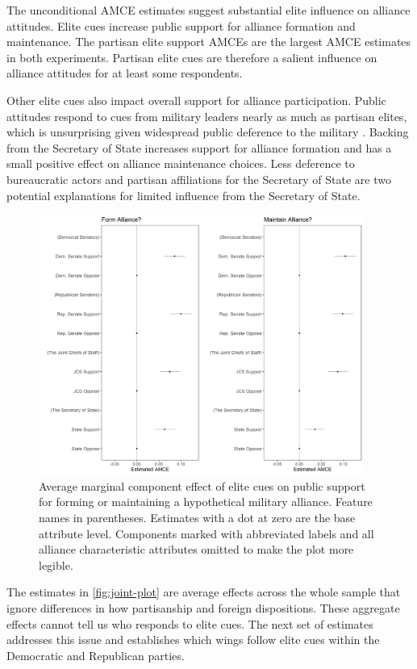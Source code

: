 \documentclass[12pt]{article}
\begin{document}
The unconditional AMCE estimates suggest substantial elite influence on alliance attitudes. 
Elite cues increase public support for alliance formation and maintenance. 
The partisan elite support AMCEs are the largest AMCE estimates in both experiments.
Partisan elite cues are therefore a salient influence on alliance attitudes for at least some respondents. 


Other elite cues also impact overall support for alliance participation. 
Public attitudes respond to cues from military leaders nearly as much as partisan elites, which is unsurprising given widespread public deference to the military \citep{Golbyetal2018}. 
Backing from the Secretary of State increases support for alliance formation and has a small positive effect on alliance maintenance choices. 
Less deference to bureaucratic actors and partisan affiliations for the Secretary of State are two potential explanations for limited influence from the Secretary of State. 


\begin{figure}[htpb]
	\centering
		\includegraphics[width=0.95\textwidth]{../figures/joint-amce-plots-el.png}
	\caption{Average marginal component effect of elite cues on public support for forming or maintaining a hypothetical military alliance. Feature names in parentheses. Estimates with a dot at zero are the base attribute level. Components marked with abbreviated labels and all alliance characteristic attributes omitted to make the plot more legible.}
	\label{fig:joint-plot}
\end{figure}


The estimates in \autoref{fig:joint-plot} are average effects across the whole sample that ignore differences in how partisanship and foreign dispositions.
These aggregate effects cannot tell us who responds to elite cues. 
The next set of estimates addresses this issue and establishes which wings follow elite cues within the Democratic and Republican parties. 
\end{document}
